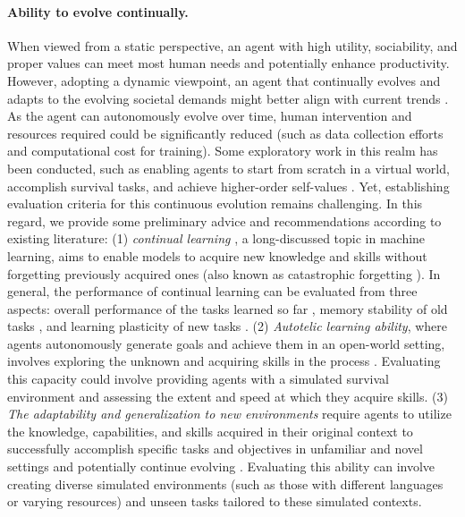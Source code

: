 \paragraph{Ability to evolve continually.}
When viewed from a static perspective, an agent with high utility, sociability, and proper values can meet most human needs and potentially enhance productivity. 
However, adopting a dynamic viewpoint, an agent that continually evolves and adapts to the evolving societal demands might better align with current trends \cite{DBLP:journals/corr/abs-2305-12487}. 
As the agent can autonomously evolve over time, human intervention and resources required could be significantly reduced (such as data collection efforts and computational cost for training). Some exploratory work in this realm has been conducted, such as enabling agents to start from scratch in a virtual world, accomplish survival tasks, and achieve higher-order self-values \cite{DBLP:journals/corr/abs-2305-16291}.  Yet, establishing evaluation criteria for this continuous evolution remains challenging. In this regard, we provide some preliminary advice and recommendations according to existing literature:
(1) \textit{continual learning} \cite{Ke2022ContinualLO, Wang2023ACS}, a long-discussed topic in machine learning, aims to enable models to acquire new knowledge and skills without forgetting previously acquired ones (also known as catastrophic forgetting \cite{McCloskey1989CatastrophicII}). 
In general, the performance of continual learning can be evaluated from three aspects: overall performance of the tasks learned so far \cite{chaudhry2018riemannian, hou2019learning}, memory stability of old tasks \cite{lopez2017gradient}, and learning plasticity of new tasks \cite{lopez2017gradient}. %
(2) \textit{Autotelic learning ability}, where agents autonomously generate goals and achieve them in an open-world setting, involves exploring the unknown and acquiring skills in the process \cite{DBLP:journals/corr/abs-2305-12487,DBLP:journals/jair/ColasKSO22}. Evaluating this capacity could involve providing agents with a simulated survival environment and assessing the extent and speed at which they acquire skills.
(3) \textit{The adaptability and generalization to new environments} require agents to utilize the knowledge, capabilities, and skills acquired in their original context to successfully accomplish specific tasks and objectives in unfamiliar and novel settings and potentially continue evolving \cite{DBLP:journals/corr/abs-2305-16291}. Evaluating this ability can involve creating diverse simulated environments (such as those with different languages or varying resources) and unseen tasks tailored to these simulated contexts.


